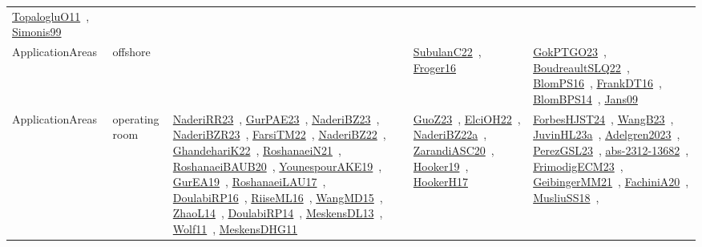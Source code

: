 {\begin{longtable}{lp{3cm}>{\raggedright\arraybackslash}p{6cm}>{\raggedright\arraybackslash}p{6cm}>{\raggedright\arraybackslash}p{8cm}}
\href{../works/TopalogluO11.pdf}{TopalogluO11}~\cite{TopalogluO11}, \href{../works/Simonis99.pdf}{Simonis99}~\cite{Simonis99}\\
\index{offshore}\index{ApplicationAreas!offshore}ApplicationAreas & offshore &  & \href{../works/SubulanC22.pdf}{SubulanC22}~\cite{SubulanC22}, \href{../works/Froger16.pdf}{Froger16}~\cite{Froger16} & \href{../works/GokPTGO23.pdf}{GokPTGO23}~\cite{GokPTGO23}, \href{../works/BoudreaultSLQ22.pdf}{BoudreaultSLQ22}~\cite{BoudreaultSLQ22}, \href{../works/BlomPS16.pdf}{BlomPS16}~\cite{BlomPS16}, \href{../works/FrankDT16.pdf}{FrankDT16}~\cite{FrankDT16}, \href{../works/BlomBPS14.pdf}{BlomBPS14}~\cite{BlomBPS14}, \href{../works/Jans09.pdf}{Jans09}~\cite{Jans09}\\
\index{operating room}\index{ApplicationAreas!operating room}ApplicationAreas & operating room & \href{../works/NaderiRR23.pdf}{NaderiRR23}~\cite{NaderiRR23}, \href{../works/GurPAE23.pdf}{GurPAE23}~\cite{GurPAE23}, \href{../works/NaderiBZ23.pdf}{NaderiBZ23}~\cite{NaderiBZ23}, \href{../works/NaderiBZR23.pdf}{NaderiBZR23}~\cite{NaderiBZR23}, \href{../works/FarsiTM22.pdf}{FarsiTM22}~\cite{FarsiTM22}, \href{../works/NaderiBZ22.pdf}{NaderiBZ22}~\cite{NaderiBZ22}, \href{../works/GhandehariK22.pdf}{GhandehariK22}~\cite{GhandehariK22}, \href{../works/RoshanaeiN21.pdf}{RoshanaeiN21}~\cite{RoshanaeiN21}, \href{../works/RoshanaeiBAUB20.pdf}{RoshanaeiBAUB20}~\cite{RoshanaeiBAUB20}, \href{../works/YounespourAKE19.pdf}{YounespourAKE19}~\cite{YounespourAKE19}, \href{../works/GurEA19.pdf}{GurEA19}~\cite{GurEA19}, \href{../works/RoshanaeiLAU17.pdf}{RoshanaeiLAU17}~\cite{RoshanaeiLAU17}, \href{../works/DoulabiRP16.pdf}{DoulabiRP16}~\cite{DoulabiRP16}, \href{../works/RiiseML16.pdf}{RiiseML16}~\cite{RiiseML16}, \href{../works/WangMD15.pdf}{WangMD15}~\cite{WangMD15}, \href{../works/ZhaoL14.pdf}{ZhaoL14}~\cite{ZhaoL14}, \href{../works/DoulabiRP14.pdf}{DoulabiRP14}~\cite{DoulabiRP14}, \href{../works/MeskensDL13.pdf}{MeskensDL13}~\cite{MeskensDL13}, \href{../works/Wolf11.pdf}{Wolf11}~\cite{Wolf11}, \href{../works/MeskensDHG11.pdf}{MeskensDHG11}~\cite{MeskensDHG11} & \href{../works/GuoZ23.pdf}{GuoZ23}~\cite{GuoZ23}, \href{../works/ElciOH22.pdf}{ElciOH22}~\cite{ElciOH22}, \href{../works/NaderiBZ22a.pdf}{NaderiBZ22a}~\cite{NaderiBZ22a}, \href{../works/ZarandiASC20.pdf}{ZarandiASC20}~\cite{ZarandiASC20}, \href{../works/Hooker19.pdf}{Hooker19}~\cite{Hooker19}, \href{../works/HookerH17.pdf}{HookerH17}~\cite{HookerH17} & \href{../works/ForbesHJST24.pdf}{ForbesHJST24}~\cite{ForbesHJST24}, \href{../works/WangB23.pdf}{WangB23}~\cite{WangB23}, \href{../works/JuvinHL23a.pdf}{JuvinHL23a}~\cite{JuvinHL23a}, \href{../works/Adelgren2023.pdf}{Adelgren2023}~\cite{Adelgren2023}, \href{../works/PerezGSL23.pdf}{PerezGSL23}~\cite{PerezGSL23}, \href{../works/abs-2312-13682.pdf}{abs-2312-13682}~\cite{abs-2312-13682}, \href{../works/FrimodigECM23.pdf}{FrimodigECM23}~\cite{FrimodigECM23}, \href{../works/GeibingerMM21.pdf}{GeibingerMM21}~\cite{GeibingerMM21}, \href{../works/FachiniA20.pdf}{FachiniA20}~\cite{FachiniA20}, \href{../works/MusliuSS18.pdf}{MusliuSS18}~\cite{MusliuSS18}, 
\end{longtable}}
